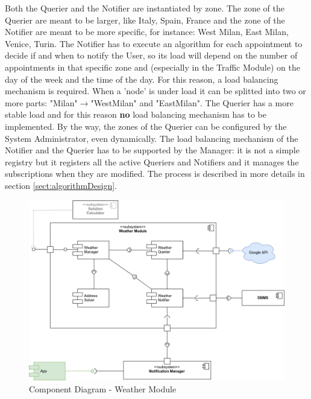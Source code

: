 		\medskip
		Both the Querier and the Notifier are instantiated by zone. The zone of the Querier are meant to be larger, like Italy, Spain, France and the zone of the Notifier are meant to be more specific, for instance: West Milan, East Milan, Venice, Turin.\newline
		The Notifier has to execute an algorithm for each appointment to decide if and when to notify the User, so its load will depend on the number of appointments in that specific zone and (especially in the Traffic Module) on the day of the week and the time of the day. For this reason, a load balancing mechanism is required. When a 'node' is under load it can be splitted into two or more parts: "Milan"$\rightarrow$"WestMilan" and "EastMilan".\newline
		The Querier has a more stable load and for this reason \textbf{no} load balancing mechanism has to be implemented. By the way, the zones of the Querier can be configured by the System Administrator, even dynamically.\newline
		The load balancing mechanism of the Notifier and the  Querier has to be supported by the Manager: it is not a simple registry but it registers all the active Queriers and Notifiers and it manages the subscriptions when they are modified.\newline
		The process is described in more details in section \ref{sect:algorithmDesign}.

		\begin{figure}[H]
			\centerline{\includegraphics[width=0.9\paperwidth]{Images/CD_WeatherModule}}
			\caption{Component Diagram - Weather Module}
		\end{figure}


